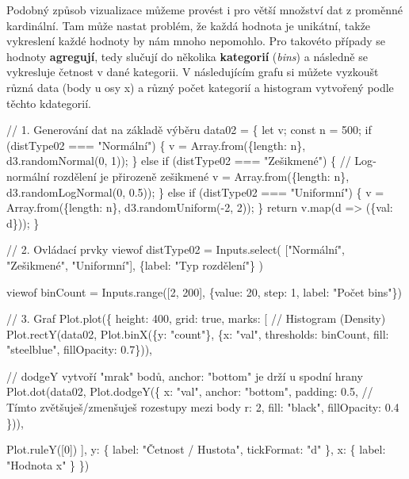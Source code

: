 \documentclass[
  czech,
  11pt,
  letterpaper,
  DIV=11,
  numbers=noendperiod]{scrreprt}
\newenvironment{Shaded}{\begin{snugshade}}{\end{snugshade}}
\newcommand{\NormalTok}[1]{\textcolor[rgb]{0.00,0.23,0.31}{#1}}
\begin{document}
Podobný způsob vizualizace můžeme provést i pro větší množství dat z
proměnné kardinální. Tam může nastat problém, že každá hodnota je
unikátní, takže vykreslení každé hodnoty by nám mnoho nepomohlo. Pro
takovéto případy se hodnoty \textbf{agregují}, tedy slučují do několika
\textbf{kategorií} (\emph{bins}) a následně se vykresluje četnost v dané
kategorii. V následujícím grafu si můžete vyzkoušt různá data (body u
osy x) a různý počet kategorií a histogram vytvořený podle těchto
kdategorií.

\begin{Shaded}
\begin{Highlighting}[]
\NormalTok{// 1. Generování dat na základě výběru}
\NormalTok{data02 = \{}
\NormalTok{  let v;}
\NormalTok{  const n = 500;}
\NormalTok{  if (distType02 === "Normální") \{}
\NormalTok{    v = Array.from(\{length: n\}, d3.randomNormal(0, 1));}
\NormalTok{  \} else if (distType02 === "Zešikmené") \{}
\NormalTok{    // Log{-}normální rozdělení je přirozeně zešikmené}
\NormalTok{    v = Array.from(\{length: n\}, d3.randomLogNormal(0, 0.5));}
\NormalTok{  \} else if (distType02 === "Uniformní") \{}
\NormalTok{    v = Array.from(\{length: n\}, d3.randomUniform({-}2, 2));}
\NormalTok{  \}}
\NormalTok{  return v.map(d =\textgreater{} (\{val: d\}));}
\NormalTok{\}}

\NormalTok{// 2. Ovládací prvky}
\NormalTok{viewof distType02 = Inputs.select(}
\NormalTok{  ["Normální", "Zešikmené", "Uniformní"], }
\NormalTok{  \{label: "Typ rozdělení"\}}
\NormalTok{)}

\NormalTok{viewof binCount = Inputs.range([2, 200], \{value: 20, step: 1, label: "Počet bins"\})}

\NormalTok{// 3. Graf}
\NormalTok{Plot.plot(\{}
\NormalTok{  height: 400,}
\NormalTok{  grid: true,}
\NormalTok{  marks: [}
\NormalTok{    // Histogram (Density)}
\NormalTok{    Plot.rectY(data02, Plot.binX(\{y: "count"\}, \{x: "val", thresholds: binCount, fill: "steelblue", fillOpacity: 0.7\})),}
    
\NormalTok{  // dodgeY vytvoří "mrak" bodů, anchor: "bottom" je drží u spodní hrany}
\NormalTok{    Plot.dot(data02, Plot.dodgeY(\{}
\NormalTok{      x: "val", }
\NormalTok{      anchor: "bottom", }
\NormalTok{      padding: 0.5, // Tímto zvětšuješ/zmenšuješ rozestupy mezi body}
\NormalTok{      r: 2, }
\NormalTok{      fill: "black",}
\NormalTok{      fillOpacity: 0.4}
\NormalTok{    \})),}
    
\NormalTok{    Plot.ruleY([0])}
\NormalTok{  ],}
\NormalTok{  y: \{}
\NormalTok{    label: "Četnost / Hustota",}
\NormalTok{    tickFormat: "d"}
\NormalTok{  \},}
\NormalTok{  x: \{}
\NormalTok{    label: "Hodnota x"}
\NormalTok{  \}}
\NormalTok{\})}
\end{Highlighting}
\end{Shaded}
\end{document}
